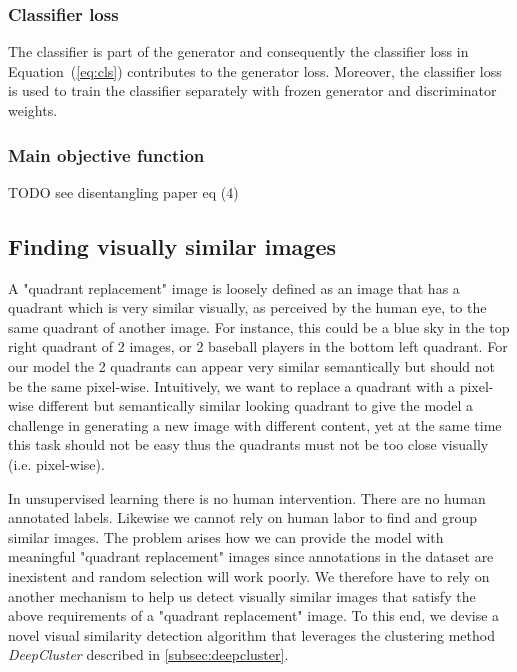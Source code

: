 \documentclass[12pt,a4paper]{article}
\begin{document}
\subsubsection{Classifier loss}
The classifier is part of the generator and consequently the classifier loss in Equation~(\ref{eq:cls}) contributes to the generator loss. Moreover, the classifier loss is used to train the classifier separately with frozen generator and discriminator weights.

\subsubsection{Main objective function}
TODO see disentangling paper eq (4)

\subsection{Finding visually similar images} \label{subsec:img_clustering}
A "quadrant replacement" image is loosely defined as an image that has a quadrant which is very similar visually, as perceived by the human eye, to the same quadrant of another image. For instance, this could be a blue sky in the top right quadrant of 2 images, or 2 baseball players in the bottom left quadrant. For our model the 2 quadrants can appear very similar semantically but should not be the same pixel-wise. Intuitively, we want to replace a quadrant with a pixel-wise different but semantically similar looking quadrant to give the model a challenge in generating a new image with different content, yet at the same time this task should not be easy thus the quadrants must not be too close visually (i.e. pixel-wise).

In unsupervised learning there is no human intervention. There are no human annotated labels. Likewise we cannot rely on human labor to find and group similar images. The problem arises how we can provide the model with meaningful "quadrant replacement" images since annotations in the dataset are inexistent and random selection will work poorly. We therefore have to rely on another mechanism to help us detect visually similar images that satisfy the above requirements of a "quadrant replacement" image. To this end, we devise a novel visual similarity detection algorithm that leverages the clustering method \textit{DeepCluster} described in \ref{subsec:deepcluster}.
\end{document}
